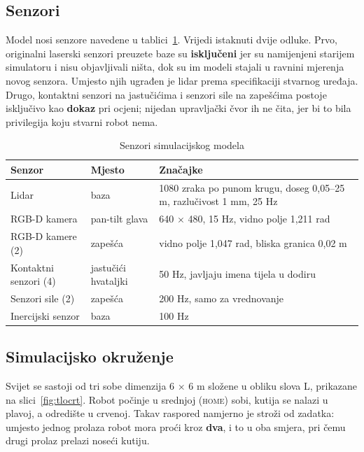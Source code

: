 \documentclass[12pt,a4paper]{article}
\begin{document}
\subsection{Senzori}

Model nosi senzore navedene u tablici~\ref{tab:senzori}. Vrijedi istaknuti dvije odluke. Prvo,
originalni laserski senzori preuzete baze su \textbf{isključeni} jer su namijenjeni starijem
simulatoru i nisu objavljivali ništa, dok su im modeli stajali u ravnini mjerenja novog senzora.
Umjesto njih ugrađen je lidar prema specifikaciji stvarnog uređaja. Drugo, kontaktni senzori na
jastučićima i senzori sile na zapešćima postoje isključivo kao \textbf{dokaz} pri ocjeni;
nijedan upravljački čvor ih ne čita, jer bi to bila privilegija koju stvarni robot nema.

\begin{table}[!htbp]
    \centering
    \caption{Senzori simulacijskog modela}
    \label{tab:senzori}
    \scriptsize
    \begin{tabularx}{\textwidth}{@{}l l X@{}}
        \toprule
        \textbf{Senzor} & \textbf{Mjesto} & \textbf{Značajke} \\
        \midrule
        Lidar                & baza      & 1080 zraka po punom krugu, doseg 0,05--25 m, razlučivost 1 mm, 25 Hz \\
        RGB-D kamera         & pan-tilt glava & 640 $\times$ 480, 15 Hz, vidno polje 1,211 rad \\
        RGB-D kamere (2)     & zapešća   & vidno polje 1,047 rad, bliska granica 0,02 m \\
        Kontaktni senzori (4)& jastučići hvataljki & 50 Hz, javljaju imena tijela u dodiru \\
        Senzori sile (2)     & zapešća   & 200 Hz, samo za vrednovanje \\
        Inercijski senzor    & baza      & 100 Hz \\
        \bottomrule
    \end{tabularx}
\end{table}

\subsection{Simulacijsko okruženje}

Svijet se sastoji od tri sobe dimenzija 6 $\times$ 6 m složene u obliku slova L, prikazane na
slici~\ref{fig:tlocrt}. Robot počinje u srednjoj (\textsc{home}) sobi, kutija se nalazi u plavoj,
a odredište u crvenoj. Takav raspored namjerno je stroži od zadatka: umjesto jednog prolaza robot
mora proći kroz \textbf{dva}, i to u oba smjera, pri čemu drugi prolaz prelazi noseći kutiju.
\end{document}
